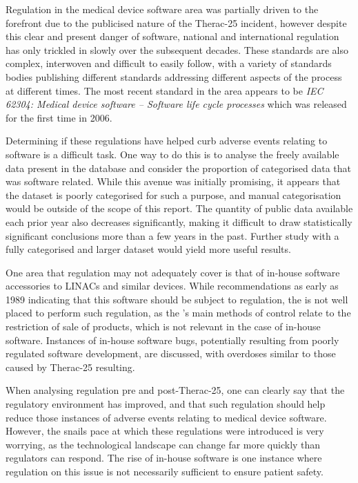 \documentclass{cshonours}
\newcommand{\ther}{Therac-25\xspace}
\begin{document}
Regulation in the medical device software area was partially driven to the forefront due to the publicised nature of the \ther incident, however despite this clear and present danger of software, national and international regulation has only trickled in slowly over the subsequent decades. These standards are also complex, interwoven and difficult to easily follow, with a variety of standards bodies publishing different standards addressing different aspects of the process at different times. The most recent standard in the area appears to be \textit{IEC 62304: Medical device software -- Software life cycle processes} which was released for the first time in 2006.

Determining if these regulations have helped curb adverse events relating to software is a difficult task. One way to do this is to analyse the freely available data present in the \fda \maude database and consider the proportion of categorised data that was software related. While this avenue was initially promising, it appears that the dataset is poorly categorised for such a purpose, and manual categorisation would be outside of the scope of this report. The quantity of public data available each prior year also decreases significantly, making it difficult to draw statistically significant conclusions more than a few years in the past. Further study with a fully categorised and larger dataset would yield more useful results.

One area that regulation may not adequately cover is that of in-house software accessories to LINACs and similar devices. While \fda recommendations as early as 1989 indicating that this software should be subject to regulation, the \fda is not well placed to perform such regulation, as the \fda's main methods of control relate to the restriction of sale of products, which is not relevant in the case of in-house software. Instances of in-house software bugs, potentially resulting from poorly regulated software development, are discussed, with overdoses similar to those caused by \ther resulting.

When analysing regulation pre and post-\ther, one can clearly say that the regulatory environment has improved, and that such regulation should help reduce those instances of adverse events relating to medical device software. However, the snails pace at which these regulations were introduced is very worrying, as the technological landscape can change far more quickly than regulators can respond. The rise of in-house software is one instance where regulation on this issue is not necessarily sufficient to ensure patient safety.
\end{document}
